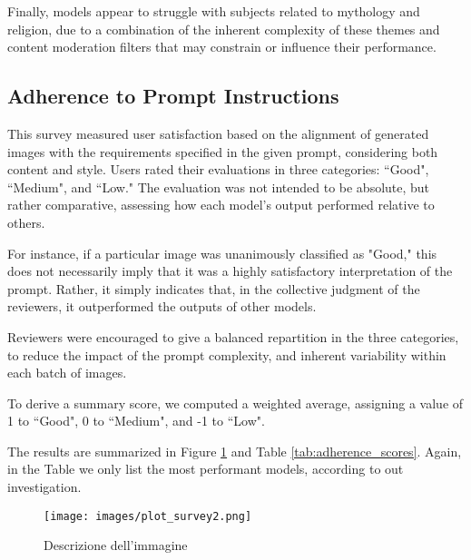 \documentclass[sn-mathphys]{sn-jnl}
\begin{document}
Finally, models appear to struggle with subjects related to mythology and religion, due to a combination of the inherent complexity of these themes and content moderation filters that may constrain or influence their performance.



\subsection{Adherence to Prompt Instructions}
\label{sec:adherence}
This survey measured user satisfaction based on the alignment of generated images with the requirements specified in the given prompt, considering both content and style. Users rated their evaluations in three categories: ``Good", ``Medium", and ``Low." The evaluation was not intended to be absolute, but rather comparative, assessing how each model's output performed relative to others.

For instance, if a particular image was unanimously classified as "Good," this does not necessarily imply that it was a highly satisfactory interpretation of the prompt. Rather, it simply indicates that, in the collective judgment of the reviewers, it outperformed the outputs of other models.

Reviewers were encouraged to give a balanced repartition in the three categories,
to reduce the impact of the prompt complexity, and inherent variability within each batch of images.

To derive a summary score, we computed a weighted average, assigning a value of 1 to ``Good", 0 to ``Medium", and -1 to ``Low". 

The results are summarized in Figure \ref{fig:plot_survey2} and Table \ref{tab:adherence_scores}. Again, in the Table we only list the most performant models, according to out investigation.

\begin{figure}[h] %
    \centering
    \texttt{[image: images/plot\_survey2.png]} %
    \caption{Descrizione dell'immagine}
    \label{fig:plot_survey2} %
\end{figure}
\end{document}
